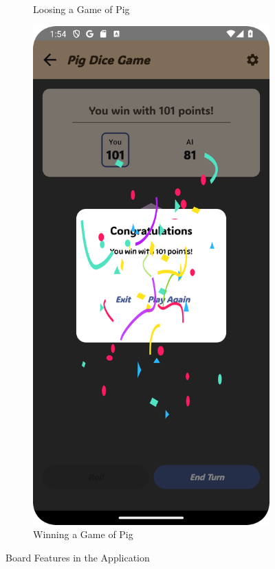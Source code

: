 \begin{figure}[h]
\begin{subfigure}[b]{0.27\textwidth}
        \caption{Loosing a Game of Pig}
    \end{subfigure}
    \hfill
    \begin{subfigure}[b]{0.27\textwidth}
        \includegraphics[width=\textwidth]{img/pig board3.png}
        \caption{Winning a Game of Pig}
    \end{subfigure}
    \caption{Board Features in the Application}
\end{figure}


